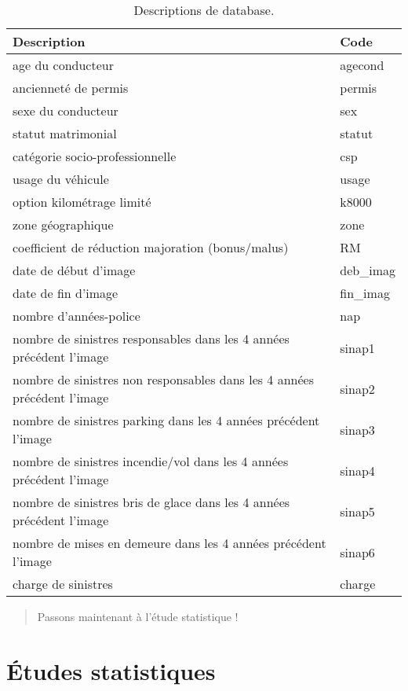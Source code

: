 \documentclass[
]{book}
\theoremstyle{definition}
\theoremstyle{definition}
\theoremstyle{definition}
\theoremstyle{definition}
\theoremstyle{remark}
\begin{document}
\begin{table}

\caption{\label{tab:unnamed-chunk-2}Descriptions de database.}
\centering
\begin{tabular}[t]{ll}
\toprule
Description & Code\\
\midrule
age du conducteur & agecond\\
ancienneté de permis & permis\\
sexe du conducteur & sex\\
statut matrimonial & statut\\
catégorie socio-professionnelle & csp\\
\addlinespace
usage du véhicule & usage\\
option kilométrage limité & k8000\\
zone géographique & zone\\
coefficient de réduction majoration (bonus/malus) & RM\\
date de début d'image & deb\_imag\\
\addlinespace
date de fin d'image & fin\_imag\\
nombre d'années-police & nap\\
nombre de sinistres responsables dans les 4 années précédent l'image & sinap1\\
nombre de sinistres non responsables dans les 4 années précédent l'image & sinap2\\
nombre de sinistres parking dans les 4 années précédent l'image & sinap3\\
\addlinespace
nombre de sinistres incendie/vol dans les 4 années précédent l'image & sinap4\\
nombre de sinistres bris de glace dans les 4 années précédent l'image & sinap5\\
nombre de mises en demeure dans les 4 années précédent l'image & sinap6\\
charge de sinistres & charge\\
\bottomrule
\end{tabular}
\end{table}

\begin{quote}
Passons maintenant à l'étude statistique !
\end{quote}

\hypertarget{etudestats}{%
\chapter{Études statistiques}\label{etudestats}}
\end{document}
